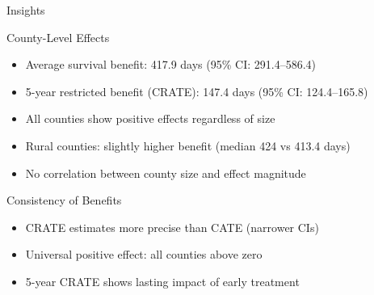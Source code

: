 \documentclass{beamer}
\begin{document}
    \begin{frame}{Insights}
    
    
      \small
          
          \begin{block}{County-Level Effects}
          \begin{itemize}
          \item Average survival benefit: 417.9 days (95\% CI: 291.4--586.4)
          \item 5-year restricted benefit (CRATE): 147.4 days (95\% CI: 124.4--165.8)
          \item All counties show positive effects regardless of size
          \item Rural counties: slightly higher benefit (median 424 vs 413.4 days)
          \item No correlation between county size and effect magnitude
          \end{itemize}
          \end{block}
          
         
          
          \begin{block}{Consistency of Benefits}
          \begin{itemize}
          \item CRATE estimates more precise than CATE (narrower CIs)
          \item Universal positive effect: all counties above zero
          \item 5-year CRATE shows lasting impact of early treatment
          \end{itemize}
          \end{block}
          
      
          \end{frame}
          
\end{document}
